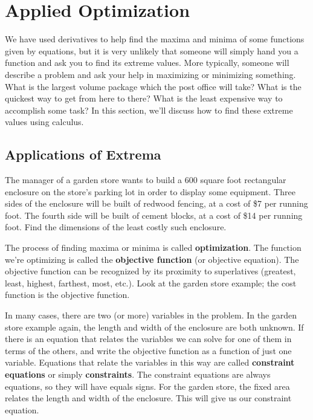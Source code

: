 \section{Applied Optimization}
\label{sec:app-opt}

We have used derivatives to help find the maxima and minima of some functions given by equations, but it is very unlikely that someone will simply hand you a function and ask you to find its extreme values. More typically, someone will describe a problem and ask your help in maximizing or minimizing something. What is the largest volume package which the post office will take? What is the quickest way to get from here to there? What is the least expensive way to accomplish some task? In this section, we'll discuss how to find these extreme values using calculus.

\subsection{Applications of Extrema}
\begin{example}
The manager of a garden store wants to build a 600 square foot rectangular enclosure on the store's parking lot in order to display some equipment. Three sides of the enclosure will be built of redwood fencing, at a cost of \$7 per running foot. The fourth side will be built of cement blocks, at a cost of \$14 per running foot. Find the dimensions of the least costly such enclosure.
\end{example}

The process of finding maxima or minima is called {\bf optimization}. The function we're optimizing is called the {\bf objective function} (or objective equation). The objective function can be recognized by its proximity to superlatives (greatest, least, highest, farthest, most, etc.). Look at the garden store example; the cost function is the objective function.

In many cases, there are two (or more) variables in the problem. In the garden store example again, the length and width of the enclosure are both unknown. If there is an equation that relates the variables we can solve for one of them in terms of the others, and write the objective function as a function of just one variable. Equations that relate the variables in this way are called {\bf constraint equations} or simply {\bf constraints}. The constraint equations are always equations, so they will have equals signs. For the garden store, the fixed area relates the length and width of the enclosure. This will give us our constraint equation.

